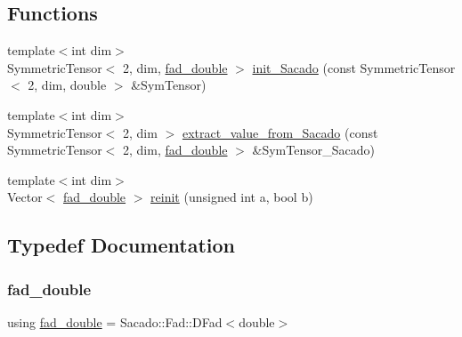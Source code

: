 \subsection*{Functions}
\begin{DoxyCompactItemize}
\item 
{\footnotesize template$<$int dim$>$ }\\Symmetric\+Tensor$<$ 2, dim, \hyperlink{Sacado-auxiliary__functions_8h_a868b94676739e612d9c95940e70892a9}{fad\+\_\+double} $>$ \hyperlink{Sacado-auxiliary__functions_8h_a05eaab6eac85b896a69c4fc2984628bc}{init\+\_\+\+Sacado} (const Symmetric\+Tensor$<$ 2, dim, double $>$ \&Sym\+Tensor)
\item 
{\footnotesize template$<$int dim$>$ }\\Symmetric\+Tensor$<$ 2, dim $>$ \hyperlink{Sacado-auxiliary__functions_8h_aad3b558b1d45add85343228c2a2146f6}{extract\+\_\+value\+\_\+from\+\_\+\+Sacado} (const Symmetric\+Tensor$<$ 2, dim, \hyperlink{Sacado-auxiliary__functions_8h_a868b94676739e612d9c95940e70892a9}{fad\+\_\+double} $>$ \&Sym\+Tensor\+\_\+\+Sacado)
\item 
{\footnotesize template$<$int dim$>$ }\\Vector$<$ \hyperlink{Sacado-auxiliary__functions_8h_a868b94676739e612d9c95940e70892a9}{fad\+\_\+double} $>$ \hyperlink{Sacado-auxiliary__functions_8h_a84c0541927416960b085bb73d2da4cf1}{reinit} (unsigned int a, bool b)
\end{DoxyCompactItemize}


\subsection{Typedef Documentation}
\mbox{\label{Sacado-auxiliary__functions_8h_a868b94676739e612d9c95940e70892a9}} 
\subsubsection{\texorpdfstring{fad\+\_\+double}{fad\_double}}
{\footnotesize\ttfamily using \hyperlink{Sacado-auxiliary__functions_8h_a868b94676739e612d9c95940e70892a9}{fad\+\_\+double} =  Sacado\+::\+Fad\+::\+D\+Fad$<$double$>$}



